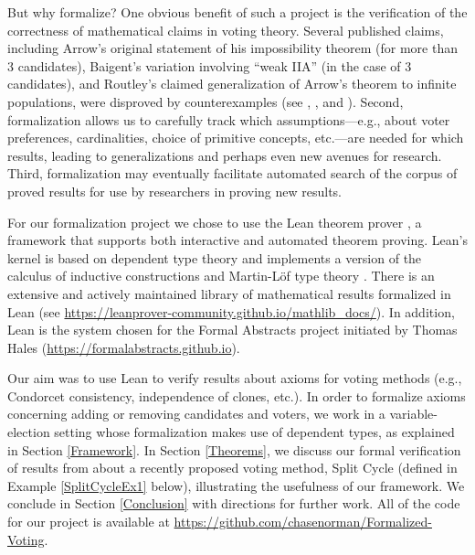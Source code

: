 \documentclass[runningheads]{llncs}
\begin{document}
But why formalize? One obvious benefit of such a project is the verification of the correctness of mathematical claims in voting theory. Several published claims, including Arrow's \cite{Arrow1951} original statement of his impossibility theorem (for more than 3 candidates), Baigent's \cite{Baigent1987} variation involving ``weak IIA'' (in the case of 3 candidates), and Routley's \cite{Routley1979} claimed generalization of Arrow's theorem to infinite populations, were disproved by counterexamples (see \cite{Blau1957}, \cite{Campbell2000}, and \cite{Blau1979}). Second, formalization allows us to carefully track  which assumptions---e.g., about voter preferences, cardinalities, choice of primitive concepts, etc.---are needed for which results, leading to generalizations and perhaps even new avenues for research. Third, formalization may eventually facilitate automated search of the corpus of proved results for use by researchers in proving new results.


For our formalization project we chose to use the Lean theorem prover \cite{Lean}, a framework that supports both interactive and automated theorem proving.   Lean's kernel is based on dependent type theory and   implements a version of the calculus of inductive constructions \cite{Coquand1988}  and Martin-L\"of type theory \cite{MartinLof1984}. There is an extensive and actively maintained  library of mathematical results formalized in Lean (see \url{https://leanprover-community.github.io/mathlib_docs/}). In addition, Lean is the system chosen for the Formal Abstracts project initiated by Thomas Hales (\url{https://formalabstracts.github.io}). %
 
Our aim was to use Lean to verify results about axioms for voting methods (e.g., Condorcet consistency, independence of clones, etc.). In order to formalize axioms concerning adding or removing candidates and voters, we work in a variable-election setting whose formalization makes use of dependent types, as explained in Section \ref{Framework}.  In Section \ref{Theorems}, we discuss our formal verification of results from \cite{HP2020b} about a recently proposed voting method, Split Cycle (defined in Example \ref{SplitCycleEx1} below), illustrating the usefulness  of our  framework. We conclude in Section \ref{Conclusion} with directions for further work. All of the code for our project is available at \url{https://github.com/chasenorman/Formalized-Voting}.
\end{document}
